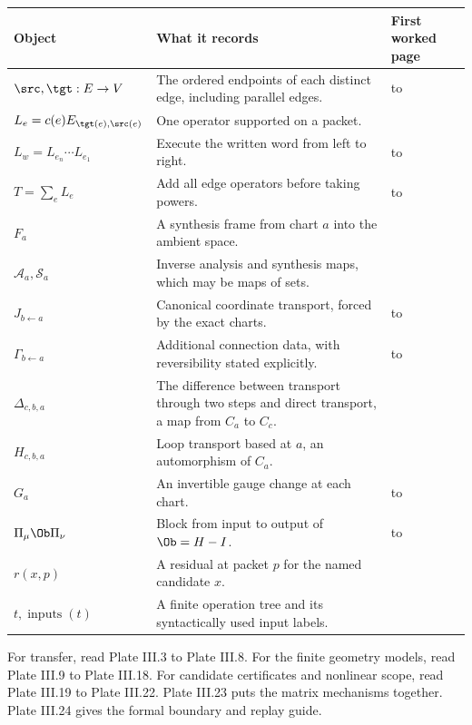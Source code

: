 {\small
\begin{tabularx}{\linewidth}{@{}p{.27\linewidth}Yp{.20\linewidth}@{}}\toprule
\textbf{Object} & \textbf{What it records} & \textbf{First worked page}\\\midrule
$\src,\tgt:E\to V$ & The ordered endpoints of each distinct edge, including parallel edges. &  to \\
$L_e=c(e)E_{\tgt(e),\src(e)}$ & One operator supported on a packet. & \\
$L_w=L_{e_n}\cdots L_{e_1}$ & Execute the written word from left to right. &  to \\
$T=\sum_eL_e$ & Add all edge operators before taking powers. &  to \\
$F_a$ & A synthesis frame from chart $a$ into the ambient space. & \\
$\mathcal A_a,\mathcal S_a$ & Inverse analysis and synthesis maps, which may be maps of sets. & \\
$J_{b\leftarrow a}$ & Canonical coordinate transport, forced by the exact charts. &  to \\
$\Gamma_{b\leftarrow a}$ & Additional connection data, with reversibility stated explicitly. &  to \\
$\Delta_{c,b,a}$ & The difference between transport through two steps and direct transport, a map from $C_a$ to $C_c$. & \\
$H_{c,b,a}$ & Loop transport based at $a$, an automorphism of $C_a$. & \\
$G_a$ & An invertible gauge change at each chart. &  to \\
$\Pi_\mu\Ob\Pi_\nu$ & Block from input to output of $\Ob=H-I$. &  to \\
$r(x,p)$ & A residual at packet $p$ for the named candidate $x$. & \\
$t,\operatorname{inputs}(t)$ & A finite operation tree and its syntactically used input labels. & \\\bottomrule
\end{tabularx}}

For transfer, read Plate III.3 to Plate III.8. For the finite geometry models, read Plate III.9 to Plate III.18. For candidate certificates and nonlinear scope, read Plate III.19 to Plate III.22. Plate III.23 puts the matrix mechanisms together. Plate III.24 gives the formal boundary and replay guide.

